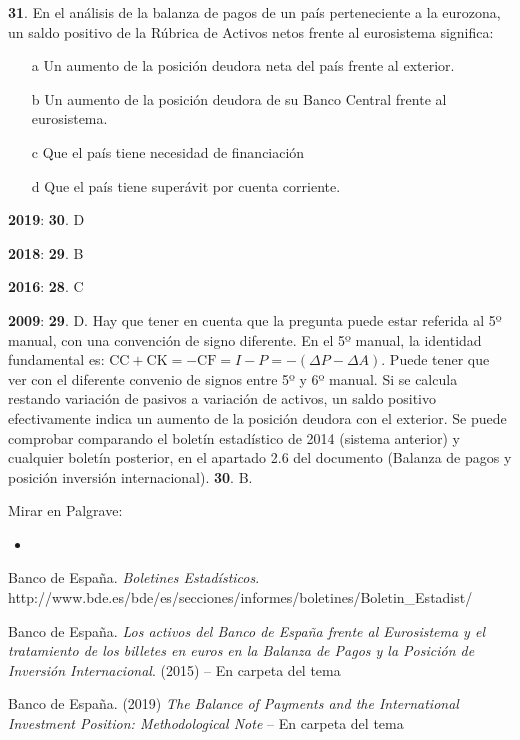 \documentclass{nuevotema}
\begin{document}
\textbf{31}. En el análisis de la balanza de pagos de un país perteneciente a la eurozona, un saldo positivo de la Rúbrica de Activos netos frente al eurosistema significa:

\begin{enumerate}
    \item[a] Un aumento de la posición deudora neta del país frente al exterior.
    \item[b] Un aumento de la posición deudora de su Banco Central frente al eurosistema.
    \item[c] Que el país tiene necesidad de financiación
    \item[d] Que el país tiene superávit por cuenta corriente.
\end{enumerate}

\notas

\textbf{2019}: \textbf{30}. D

\textbf{2018}: \textbf{29}. B

\textbf{2016}: \textbf{28}. C

\textbf{2009}: \textbf{29}. D. Hay que tener en cuenta que la pregunta puede estar referida al 5º manual, con una convención de signo diferente. En el 5º manual, la identidad fundamental es: $\text{CC} + \text{CK} = - \text{CF} = I - P = - (\varDelta P - \varDelta A)$. Puede tener que ver con el diferente convenio de signos entre 5º y 6º manual. Si  se calcula restando variación de pasivos a variación de activos, un saldo positivo efectivamente indica un aumento de la posición deudora con el exterior. Se puede comprobar comparando el boletín estadístico de 2014 (sistema anterior) y cualquier boletín posterior, en el apartado 2.6 del documento (Balanza de pagos y posición inversión internacional). \textbf{30}. B.

\bibliografia

Mirar en Palgrave:
\begin{itemize}
	\item
\end{itemize}

Banco de España. \textit{Boletines Estadísticos}. http://www.bde.es/bde/es/secciones/informes/boletines/Boletin\_Estadist/

Banco de España. \textit{Los activos del Banco de España frente al Eurosistema y el tratamiento de los billetes en euros en la Balanza de Pagos y la Posición de Inversión Internacional}. (2015) -- En carpeta del tema

Banco de España. (2019) \textit{The Balance of Payments and the International Investment Position: Methodological Note} -- En carpeta del tema
\end{document}
